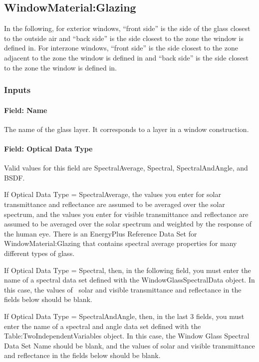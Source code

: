 \subsection{WindowMaterial:Glazing}\label{windowmaterialglazing}

In the following, for exterior windows, ``front side'' is the side of the glass closest to the outside air and ``back side'' is the side closest to the zone the window is defined in. For interzone windows, ``front side'' is the side closest to the zone adjacent to the zone the window is defined in and ``back side'' is the side closest to the zone the window is defined in.

\subsubsection{Inputs}\label{inputs-13-015}

\paragraph{Field: Name}\label{field-name-7-020}

The name of the glass layer. It corresponds to a layer in a window construction.

\paragraph{Field: Optical Data Type}\label{field-optical-data-type}

Valid values for this field are SpectralAverage, Spectral, SpectralAndAngle, and BSDF.

If Optical Data Type = SpectralAverage, the values you enter for solar transmittance and reflectance are assumed to be averaged over the solar spectrum, and the values you enter for visible transmittance and reflectance are assumed to be averaged over the solar spectrum and weighted by the response of~ the human eye. There is an EnergyPlus Reference Data Set for WindowMaterial:Glazing that contains spectral average properties for many different types of glass.

If Optical Data Type = Spectral, then, in the following field, you must enter the name of a spectral data set defined with the WindowGlassSpectralData object. In this case, the values of~ solar and visible transmittance and reflectance in the fields below should be blank.

If Optical Data Type = SpectralAndAngle, then, in the last 3 fields, you must enter the name of a spectral and angle data set defined with the Table:TwoIndependentVariables object. In this case, the Window Glass Spectral Data Set Name should be blank, and the values of solar and visible transmittance and reflectance in the fields below should be blank.

